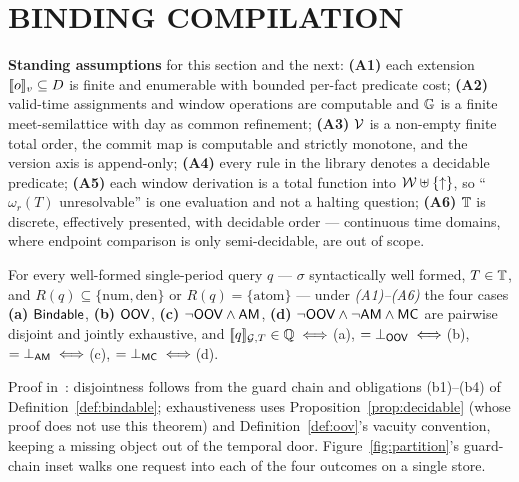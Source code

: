 
\section{BINDING COMPILATION}
\label{sec:binding}

\noindent{}\textbf{Standing assumptions} for this section and the next:
\textbf{(A1)} each extension $[\![o]\!]_v\subseteq D$ is finite and enumerable
with bounded per-fact predicate cost; \textbf{(A2)} valid-time assignments and
window operations are computable and $\mathbb{G}$ is a finite meet-semilattice with
day as common refinement; \textbf{(A3)} $\mathcal{V}$ is a non-empty finite total
order, the commit map is computable and strictly monotone, and the version axis
is append-only; \textbf{(A4)} every rule in the library denotes a decidable
predicate; \textbf{(A5)} each window derivation is a total function into
$\mathcal{W}\uplus\{\uparrow\}$, so ``$\omega_r(T)$ unresolvable'' is one evaluation
and not a halting question; \textbf{(A6)} $\mathbb{T}$ is discrete, effectively
presented, with decidable order --- continuous time domains, where endpoint
comparison is only semi-decidable, are out of scope.

\label{sec:bind:partition}%
\begin{theorem}
\label{thm:partition}
For every well-formed single-period query $q$ --- $\sigma$ syntactically well
formed, $T\in\mathbb{T}$, and $R(q)\subseteq\{\mathrm{num},\mathrm{den}\}$ or
$R(q)=\{\mathrm{atom}\}$ --- under \emph{(A1)--(A6)} the four cases
\textbf{(a)} $\mathsf{Bindable}$, \textbf{(b)} $\mathsf{OOV}$, \textbf{(c)}
$\neg\mathsf{OOV}\wedge\mathsf{AM}$, \textbf{(d)} $\neg\mathsf{OOV}\wedge\neg\mathsf{AM}\wedge\mathsf{MC}$ are
pairwise disjoint and jointly exhaustive, and
$[\![q]\!]_{\mathcal{G},T}\in\mathbb{Q}\iff$(a), $=\bot_{\mathsf{OOV}}\iff$(b),
$=\bot_{\mathsf{AM}}\iff$(c), $=\bot_{\mathsf{MC}}\iff$(d).
\end{theorem}

\noindent{} Proof in~\cite{asofgov-tr}: disjointness follows from the guard
chain and obligations (b1)--(b4) of Definition~\ref{def:bindable};
exhaustiveness uses Proposition~\ref{prop:decidable} (whose proof does not
use this theorem) and Definition~\ref{def:oov}'s vacuity convention,
keeping a missing object out of
the temporal door. Figure~\ref{fig:partition}'s guard-chain inset walks one
request into each of the four outcomes on a single store.


